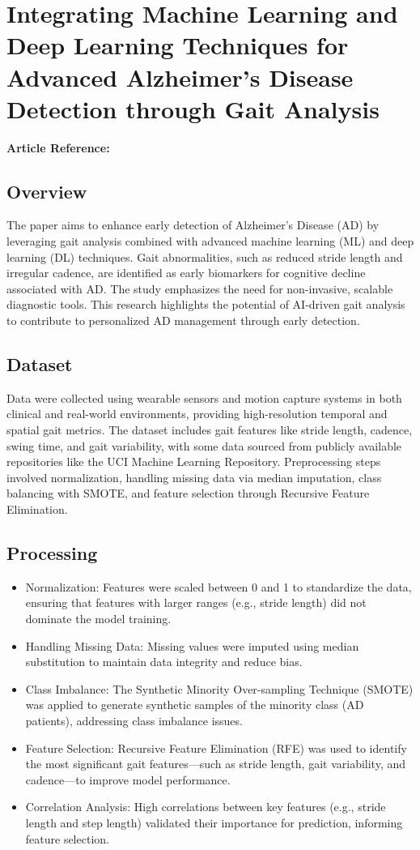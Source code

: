 \section{Integrating Machine Learning and Deep Learning Techniques for Advanced Alzheimer’s Disease Detection through Gait Analysis}
\textbf{Article Reference:} \cite{article_3}
\subsection*{Overview}
The paper aims to enhance early detection of Alzheimer’s Disease (AD) by leveraging gait analysis combined with advanced machine learning (ML) and deep learning (DL) techniques. Gait abnormalities, such as reduced stride length and irregular cadence, are identified as early biomarkers for cognitive decline associated with AD. The study emphasizes the need for non-invasive, scalable diagnostic tools. This research highlights the potential of AI-driven gait analysis to contribute to personalized AD management through early detection.

\subsection*{Dataset}
Data were collected using wearable sensors and motion capture systems in both clinical and real-world environments, providing high-resolution temporal and spatial gait metrics. The dataset includes gait features like stride length, cadence, swing time, and gait variability, with some data sourced from publicly available repositories like the UCI Machine Learning Repository. Preprocessing steps involved normalization, handling missing data via median imputation, class balancing with SMOTE, and feature selection through Recursive Feature Elimination.
\subsection*{Processing}
\begin{itemize}
    \item Normalization: Features were scaled between 0 and 1 to standardize the data, ensuring that features with larger ranges (e.g., stride length) did not dominate the model training.
    \item Handling Missing Data: Missing values were imputed using median substitution to maintain data integrity and reduce bias.
    \item Class Imbalance: The Synthetic Minority Over-sampling Technique (SMOTE) was applied to generate synthetic samples of the minority class (AD patients), addressing class imbalance issues.
    \item Feature Selection: Recursive Feature Elimination (RFE) was used to identify the most significant gait features—such as stride length, gait variability, and cadence—to improve model performance.
    \item Correlation Analysis: High correlations between key features (e.g., stride length and step length) validated their importance for prediction, informing feature selection.
\end{itemize}


